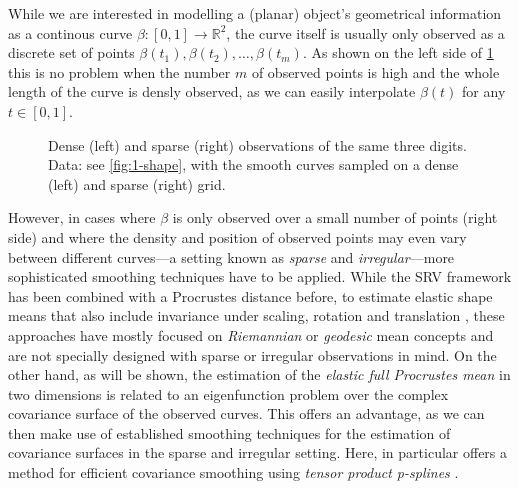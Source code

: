 While we are interested in modelling a (planar) object's geometrical information as a continous curve $\beta : [0,1] \rightarrow \mathbb{R}^2$, the curve itself is usually only observed as a discrete set of points $\beta(t_1), \beta(t_2), \dots, \beta(t_m)$.
As shown on the left side of \cref{fig:1-sparse} this is no problem when the number $m$ of observed points is high and the whole length of the curve is densly observed, as we can easily interpolate $\beta(t)$ for any $t \in [0,1]$.
\begin{figure}
  \centering
  \begin{subfigure}{.48\textwidth}
    \centering
  \end{subfigure}\hfill%
  \begin{subfigure}{.48\textwidth}
    \centering
  \end{subfigure}
  \caption{Dense (left) and sparse (right) observations of the same three digits. Data: see \cref{fig:1-shape}, with the smooth curves sampled on a dense (left) and sparse (right) grid.}
  \label{fig:1-sparse}
\end{figure}
However, in cases where $\beta$ is only observed over a small number of points (right side) and where the density and position of observed points may even vary between different curves---a setting known as \emph{sparse} and \emph{irregular}---more sophisticated smoothing techniques have to be applied.
While the SRV framework has been combined with a Procrustes distance before, to estimate elastic shape means that also include invariance under scaling, rotation and translation \parencite[see][]{SrivastavaEtAl2011}, these approaches have mostly focused on \emph{Riemannian} or \emph{geodesic} mean concepts and are not specially designed with sparse or irregular observations in mind.
On the other hand, as will be shown, the estimation of the \emph{elastic full Procrustes mean} in two dimensions is related to an eigenfunction problem over the complex covariance surface of the observed curves.
This offers an advantage, as we can then make use of established smoothing techniques for the estimation of covariance surfaces in the sparse and irregular setting.
Here, in particular \cite{CederbaumScheiplGreven2018} offers a method for efficient covariance smoothing using \emph{tensor product p-splines} \parencite[see e.g.][Chap. 8.2]{FahrmeierEtAl2013}.

